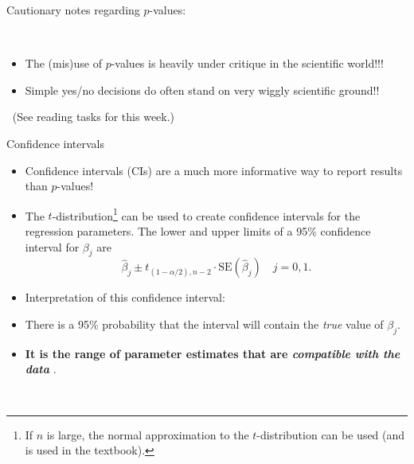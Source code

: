 \documentclass[10pt,ignorenonframetext,]{beamer}
\begin{document}
\begin{frame}

\begin{block}{Cautionary notes regarding \(p\)-values:}

\(~\)

\begin{itemize}
\item
  The (mis)use of \(p\)-values is heavily under critique in the
  scientific world!!!
\item
  Simple yes/no decisions do often stand on very wiggly scientific
  ground!!
\end{itemize}

\vspace{2mm} \(~\) (See reading tasks for this week.)

\end{block}

\end{frame}

\begin{frame}

\begin{block}{Confidence intervals}

\vspace{2mm}

\begin{itemize}
\item
  Confidence intervals (CIs) are a much more informative way to report
  results than \(p\)-values!
\item
  The
  \(t\)-distribution\footnote{If $n$ is large, the normal approximation to the $t$-distribution can be used (and is used in the textbook).}
  can be used to create confidence intervals for the regression
  parameters. The lower and upper limits of a 95\% confidence interval
  for \(\beta_j\) are
  \[\hat{\beta}_j \pm t_{(1-\alpha/2),n-2} \cdot\text{SE} (\hat{\beta}_j) \quad j=0, 1.\]
\item
  Interpretation of this confidence interval:
\item
  There is a 95\% probability that the interval will contain the
  \emph{true} value of \(\beta_j\).
\item
  \textbf{It is the range of parameter estimates that are
  \emph{compatible with the data} }.
\end{itemize}

\(~\)

\end{block}

\end{frame}
\end{document}
